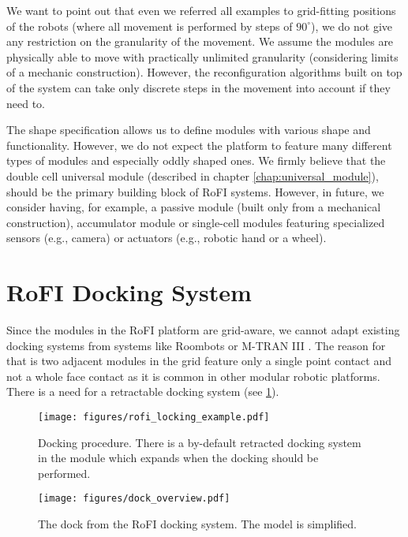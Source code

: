 We want to point out that even we referred all examples to grid-fitting
positions of the robots (where all movement is performed by steps of
$90^\circ$), we do not give any restriction on the granularity of the movement.
We assume the modules are physically able to move with practically
unlimited granularity (considering limits of a mechanic construction). However,
the reconfiguration algorithms built on top of the system can take only
discrete steps in the movement into account if they need to.

The shape specification allows us to define modules with various shape and
functionality. However, we do not expect the platform to feature many different
types of modules and especially oddly shaped ones. We firmly believe that the
double cell universal module (described in chapter \ref{chap:universal_module}),
should be the primary building block of RoFI systems. However, in future, we
consider having, for example, a passive module (built only from a mechanical
construction), accumulator module or single-cell modules featuring specialized
sensors (e.g., camera) or actuators (e.g., robotic hand or a wheel).

\section{RoFI Docking System}\label{sec:dock}

Since the modules in the RoFI platform are grid-aware, we cannot adapt existing
docking systems from systems like Roombots \cite{bonardi_locomotion_2012} or
M-TRAN III \cite{kurokawa_distributed_2008}. The reason for that is two adjacent
modules in the grid feature only a single point contact and not a whole face
contact as it is common in other modular robotic platforms. There is a need for
a retractable docking system (see \ref{fig:rofi_locking_example}).

\begin{figure}[t]
    \centering
    \texttt{[image: figures/rofi\_locking\_example.pdf]}
    \caption{Docking procedure. There is a by-default retracted docking system
    in the module which expands when the docking should be performed.}
    \label{fig:rofi_locking_example}
\end{figure}


\begin{figure}[t]
    \centering
    \texttt{[image: figures/dock\_overview.pdf]}
    \caption{The dock from the RoFI docking system. The model is simplified.}
    \label{fig:dock_overview}
\end{figure}

